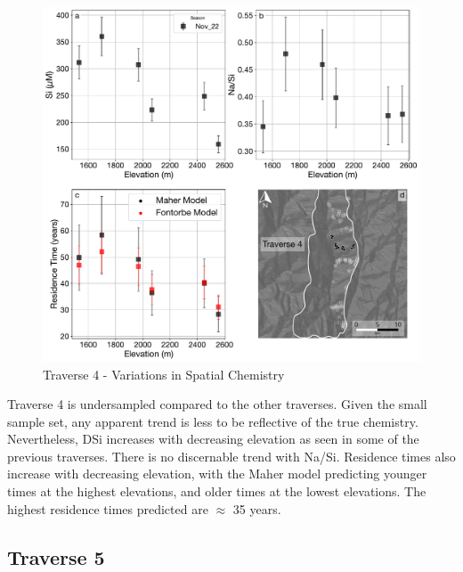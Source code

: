 \begin{figure}[h]
    \centering
        \includegraphics[width=\textwidth]{Traverse_4_summary.pdf}
    \caption{Traverse 4 - Variations in Spatial Chemistry}
    \label{fig:spatial_changes_spring4}
\end{figure}

\FloatBarrier

Traverse 4 is undersampled compared to the other traverses. Given the small sample set, any apparent trend is less to be reflective of the true chemistry. Nevertheless, DSi increases with decreasing elevation as seen in some of the previous traverses. There is no discernable trend with Na/Si. Residence times also increase with decreasing elevation, with the Maher model predicting younger times at the highest elevations, and older times at the lowest elevations. The highest residence times predicted are $\approx$ 35 years.


\newpage

\subsection{Traverse 5}

